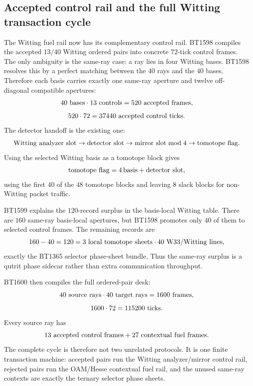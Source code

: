 \subsection{Accepted control rail and the full Witting transaction cycle}
\label{sec:bt1598-bt1600-full-witting-cycle}

The Witting fuel rail now has its complementary control rail.  BT1598 compiles
the accepted \(13/40\) Witting ordered pairs into concrete \(72\)-tick control
frames.  The only ambiguity is the same-ray case: a ray lies in four Witting
bases.  BT1598 resolves this by a perfect matching between the \(40\) rays and
the \(40\) bases.  Therefore each basis carries exactly one same-ray aperture and
twelve off-diagonal compatible apertures:
\[
  40\ {\rm bases}\cdot 13\ {\rm controls}=520\ {\rm accepted\ frames},
\]
\[
  520\cdot72=37440\ {\rm accepted\ control\ ticks}.
\]
The detector handoff is the existing one:
\[
  {\rm Witting\ analyzer\ slot}
  \to {\rm detector\ slot}
  \to {\rm mirror\ slot}\bmod 4
  \to {\rm tomotope\ flag}.
\]
Using the selected Witting basis as a tomotope block gives
\[
  {\rm tomotope\ flag}=4\,{\rm basis}+{\rm detector\ slot},
\]
using the first \(40\) of the \(48\) tomotope blocks and leaving \(8\) slack
blocks for non-Witting packet traffic.

BT1599 explains the \(120\)-record surplus in the basis-local Witting table.
There are \(160\) same-ray basis-local apertures, but BT1598 promotes only \(40\)
of them to selected control frames.  The remaining records are
\[
  160-40=120
  =
  3\ {\rm local\ tomotope\ sheets}\cdot40\ {\rm W33/Witting\ lines},
\]
exactly the BT1365 selector phase-sheet bundle.  Thus the same-ray surplus is a
qutrit phase sidecar rather than extra communication throughput.

BT1600 then compiles the full ordered-pair desk:
\[
  40\ {\rm source\ rays}\cdot40\ {\rm target\ rays}=1600\ {\rm frames},
\]
\[
  1600\cdot72=115200\ {\rm ticks}.
\]
Every source ray has
\[
  13\ {\rm accepted\ control\ frames}+27\ {\rm contextual\ fuel\ frames}.
\]
The complete cycle is therefore not two unrelated protocols.  It is one finite
transaction machine: accepted pairs run the Witting analyzer/mirror control
rail, rejected pairs run the OAM/Hesse contextual fuel rail, and the unused
same-ray contexts are exactly the ternary selector phase sheets.
